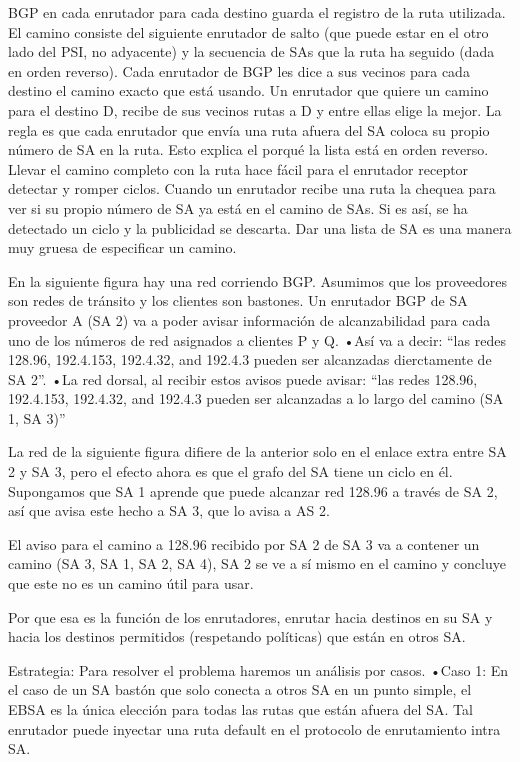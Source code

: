 \documentclass[10pt,a4paper]{report}
\begin{document}
	\par BGP en cada enrutador para cada destino guarda el registro de la ruta utilizada. El camino consiste del siguiente enrutador de salto (que puede estar en el otro lado del PSI, no adyacente) y la secuencia de SAs que la ruta ha seguido (dada en orden reverso). Cada enrutador de BGP les dice a sus vecinos para cada destino el camino exacto que está usando. Un enrutador que quiere un camino para el destino D, recibe de sus vecinos rutas a D y entre ellas elige la mejor. La regla es que cada enrutador que envía una ruta afuera del SA coloca su propio número de SA en la ruta. Esto explica el porqué la lista está en orden reverso. Llevar el camino completo con la ruta hace fácil para el enrutador receptor detectar y romper ciclos. Cuando un enrutador recibe una ruta la chequea para ver si su propio número de SA ya está en el camino de SAs. Si es así, se ha detectado un ciclo y la publicidad se descarta. Dar una lista de SA es una manera muy gruesa de especificar un camino.

	\par En la siguiente figura hay una red corriendo BGP. Asumimos que los proveedores son redes de tránsito y los clientes son bastones. Un enrutador BGP de SA proveedor A (SA 2) va a poder avisar información de alcanzabilidad para cada uno de los números de red asignados a clientes P y Q. 
•Así va a decir: “las redes 128.96, 192.4.153, 192.4.32, and 192.4.3 pueden ser alcanzadas dierctamente de SA 2”.
•La red dorsal, al recibir estos avisos puede avisar: “las redes 128.96, 192.4.153, 192.4.32, and 192.4.3 pueden ser alcanzadas a lo largo del camino (SA 1, SA 3)”

	\par La red de la siguiente figura difiere de la anterior solo en el enlace extra entre SA 2 y SA 3, pero el efecto ahora es que el grafo del SA tiene un ciclo en él.
Supongamos que SA 1 aprende que puede alcanzar red 128.96 a través de SA 2, así que avisa este hecho a SA 3, que lo avisa a AS 2.

El aviso para el camino a 128.96 recibido por SA 2 de SA 3 va a contener un camino (SA 3, SA 1, SA 2, SA 4), SA 2 se ve a sí mismo en el camino y concluye que este no es un camino útil para usar.


Por que esa es la función de los enrutadores, enrutar hacia destinos en su SA y hacia los destinos permitidos (respetando políticas) que están en otros SA.
\par Estrategia: Para resolver el problema haremos un análisis por casos.
•Caso 1: En el caso de un SA bastón que solo conecta a otros SA en un punto simple, el EBSA es la única elección para todas las rutas que están afuera del SA. Tal enrutador puede inyectar una ruta default en el protocolo de enrutamiento intra SA.
\end{document}
